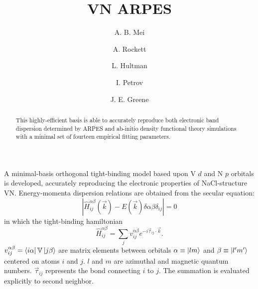 \documentclass[twocolumn,showpacs,preprintnumbers,superscriptaddress,prb,floatfix,aps,10pt]{revtex4-1}
\newcommand*{\ham}{\hat{H}}
\newcommand*{\bondvec}{\vec{\tau}_{ij}}
\begin{document}
\title{VN ARPES}

\author{A. B. Mei}

\author{A. Rockett}

\author{L. Hultman}

\author{I. Petrov}

\author{J. E. Greene}


\begin{abstract}

This highly-efficient basis is able to accurately reproduce both electronic band dispersion determined by ARPES and ab-initio density functional theory simulations with a minimal set of fourteen empirical fitting parameters.
\end{abstract}

\maketitle


A minimal-basis orthogonal tight-binding model based upon V $d$ and N $p$ orbitals is developed, accurately reproducing the electronic properties of NaCl-structure VN. Energy-momenta dispersion relations are obtained from the secular equation:
\begin{equation}
\label{eq:secular}
\left| \ham^{\alpha\beta}_{ij}(\vec{k}) - E(\vec{k})\delta{\alpha\beta}\delta_{ij} \right| = 0
\end{equation}
in which the tight-binding hamiltonian
\begin{equation}
\label{eq:ham}
\ham^{\alpha\beta}_{ij} = \sum_j v^{\alpha\beta}_{ij} e^{-i\vec{\tau}_{ij} \cdot \vec{k} }.
\end{equation}
$v^{\alpha\beta}_{ij} = \bra{i\alpha} \mathbb{V} \ket{j\beta}$ are matrix elements between orbitals $\alpha \equiv \ket{lm}$ and $\beta \equiv \ket{l'm'}$ centered on atoms $i$ and $j$.  $l$ and $m$ are azimuthal and magnetic quantum numbers. $\bondvec$ represents the bond connecting $i$ to $j$. The summation is evaluated explicitly to second neighbor.
\end{document}
